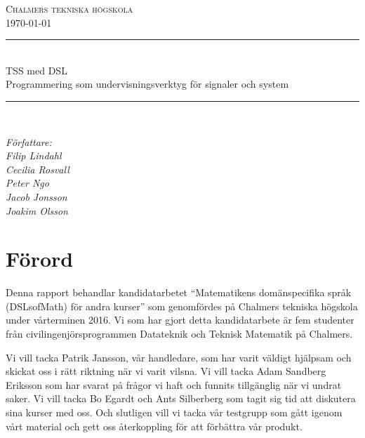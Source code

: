 \documentclass[12pt,a4paper,twoside,openright]{article}
\date{\today}
\begin{document}

\begin{titlepage} \newcommand{\HRule}{\rule{\linewidth}{0.3mm}}
  \center
  \textsc{\Large Chalmers tekniska högskola}\\[0.05cm]
  \normalsize \today

  \HRule \\[0.08cm]
  { \large TSS med DSL
    \\
    \normalsize{Programmering som undervisningsverktyg för signaler och system}
  } \\[0.08cm] %
  \HRule \\[0.3cm]

  \vfill

  \begin{flushleft}
    \small
    \emph{Författare:\\
      \quad Filip Lindahl\\
      \quad Cecilia Rosvall\\
      \quad Peter Ngo\\
      \quad Jacob Jonsson\\
      \quad Joakim Olsson\\}
  \end{flushleft}
\end{titlepage}
\newpage

\setlength{\parskip}{2mm}
\setlength{\parindent}{0pt}

\section*{Förord}
Denna rapport behandlar kandidatarbetet ``Matematikens domänspecifika språk
(DSLsofMath) för andra kurser'' som genomfördes på Chalmers tekniska högskola
 under vårterminen 2016. Vi som har gjort detta kandidatarbete är fem studenter
från civilingenjörsprogrammen Datateknik och Teknisk Matematik på Chalmers.

Vi vill tacka Patrik Jansson, vår handledare, som har varit väldigt hjälpsam
och skickat oss i rätt riktning när vi varit vilsna. Vi vill tacka Adam Sandberg Eriksson
som har svarat på frågor vi haft och funnits tillgänglig när vi undrat saker. Vi
vill tacka Bo Egardt och Ants Silberberg som tagit sig tid att diskutera sina
kurser med oss. Och slutligen vill vi tacka vår testgrupp som gått igenom vårt
material och gett oss återkoppling för att förbättra vår produkt.

\newpage
\end{document}
